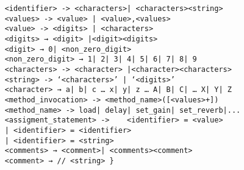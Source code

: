 \begin{verbatim}
    <identifier> -> <characters>| <characters><string>
    <values> -> <value> | <value>,<values>
    <value> -> <digits> | <characters>
    <digits> → <digit> |<digit><digits>
    <digit> → 0| <non_zero_digit>
    <non_zero_digit> → 1| 2| 3| 4| 5| 6| 7| 8| 9
    <characters> -> <character> |<character><characters>
    <string> -> ‘<characters>’ | ‘<digits>’
    <character> → a| b| c … x| y| z … A| B| C| … X| Y| Z
    <method_invocation> -> <method_name>([<values>+])
    <method_name> -> load| delay| set_gain| set_reverb|...
    <assigment_statement> -> 	<identifier> = <value> 
    | <identifier> = <identifier> 
    | <identifier> = <string>
    <comments> → <comment>| <comments><comment>
    <comment> → // <string> }
\end{verbatim}